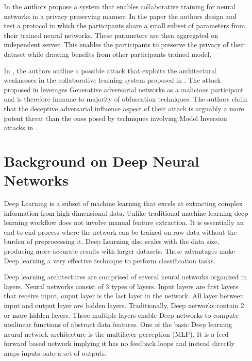 \documentclass[conference]{IEEEtran}
\begin{document}
In \cite{shokri2015privacy} the authors propose a system that enables collaborative training for neural networks in a privacy preserving manner. In the paper the authors design and test a protocol in which the participants share a small subset of parameters from their trained neural networks. These parameters are then aggregated on independent server. This enables the participants to preserve the privacy of their dataset while drawing benefits from other participants trained model.

In \cite{hitaj2017deep}, the authors outline a possible attack that exploits the architectural weaknesses in the collaborative learning system proposed in \cite{abadi2016deep}. The attack proposed in \cite{hitaj2017deep} leverages Generative adversarial networks as a malicious participant and is therefore immune to majority of obfuscation techniques. The authors claim that the  deceptive adversarial influence aspect of their attack is arguably a more potent threat than the ones posed by techniques involving Model Inversion attacks in \cite{deng2012mnist}.

\section{Background on Deep Neural Networks}
Deep Learning  is a subset of machine learning that excels at extracting complex information from high dimensional data. Unlike traditional machine learning deep learning workflow does not involve manual feature extraction. It is essentially an end-to-end process where the network can be trained on raw data without the burden of preprocessing it.
Deep Learning also scales with the data size, producing more accurate results with larger datasets.
These advantages make Deep learning a very effective technique to perform classification tasks.

Deep learning architectures are comprised of several neural networks organized in layers. Neural networks consist of 3 types of layers. Input layers are first layers that receive input, ouput layer is the last layer in the network. All layer between input and output layer are hidden layers. Traditionally, Deep networks contain 2 or more hidden layers. These multiple layers enable Deep networks to compute nonlinear functions of abstract data features.
One of the basic Deep learning neural network architecture is the multilayer perception (MLP). It is a feed-forward based network implying it has no feedback loops and instead directly maps inputs onto a set of outputs. 
\end{document}
